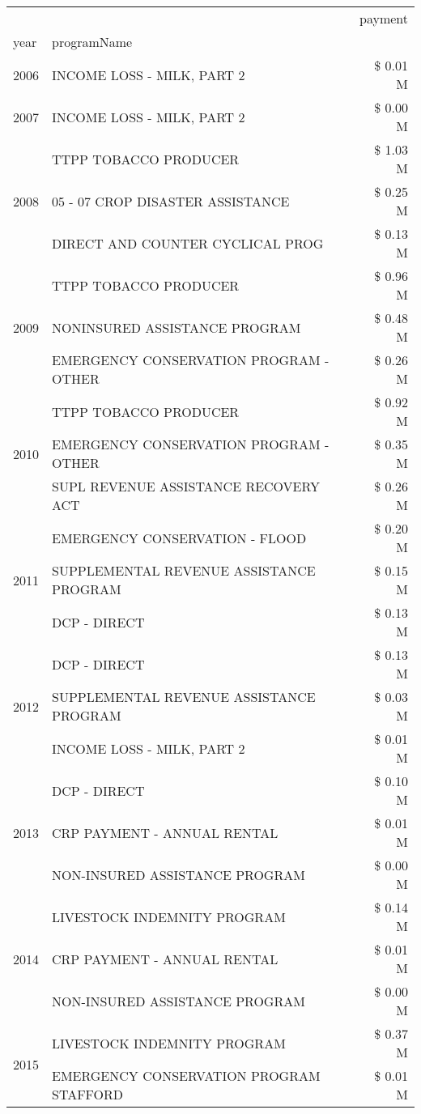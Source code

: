 \begin{tabular}{llr}
\toprule
 &  & payment \\
year & programName &  \\
\midrule
2006 & INCOME LOSS - MILK, PART 2 & \$ 0.01 M \\
\cline{1-3}
2007 & INCOME LOSS - MILK, PART 2 & \$ 0.00 M \\
\cline{1-3}
\multirow[t]{3}{*}{2008} & TTPP TOBACCO PRODUCER & \$ 1.03 M \\
 & 05 - 07 CROP DISASTER ASSISTANCE & \$ 0.25 M \\
 & DIRECT AND COUNTER CYCLICAL PROG & \$ 0.13 M \\
\cline{1-3}
\multirow[t]{3}{*}{2009} & TTPP TOBACCO PRODUCER & \$ 0.96 M \\
 & NONINSURED ASSISTANCE PROGRAM & \$ 0.48 M \\
 & EMERGENCY CONSERVATION PROGRAM - OTHER & \$ 0.26 M \\
\cline{1-3}
\multirow[t]{3}{*}{2010} & TTPP TOBACCO PRODUCER & \$ 0.92 M \\
 & EMERGENCY CONSERVATION PROGRAM - OTHER & \$ 0.35 M \\
 & SUPL REVENUE ASSISTANCE RECOVERY ACT & \$ 0.26 M \\
\cline{1-3}
\multirow[t]{3}{*}{2011} & EMERGENCY CONSERVATION - FLOOD & \$ 0.20 M \\
 & SUPPLEMENTAL REVENUE ASSISTANCE PROGRAM & \$ 0.15 M \\
 & DCP - DIRECT & \$ 0.13 M \\
\cline{1-3}
\multirow[t]{3}{*}{2012} & DCP - DIRECT & \$ 0.13 M \\
 & SUPPLEMENTAL REVENUE ASSISTANCE PROGRAM & \$ 0.03 M \\
 & INCOME LOSS - MILK, PART 2 & \$ 0.01 M \\
\cline{1-3}
\multirow[t]{3}{*}{2013} & DCP - DIRECT & \$ 0.10 M \\
 & CRP PAYMENT - ANNUAL RENTAL & \$ 0.01 M \\
 & NON-INSURED ASSISTANCE PROGRAM & \$ 0.00 M \\
\cline{1-3}
\multirow[t]{3}{*}{2014} & LIVESTOCK INDEMNITY PROGRAM & \$ 0.14 M \\
 & CRP PAYMENT - ANNUAL RENTAL & \$ 0.01 M \\
 & NON-INSURED ASSISTANCE PROGRAM & \$ 0.00 M \\
\cline{1-3}
\multirow[t]{3}{*}{2015} & LIVESTOCK INDEMNITY PROGRAM & \$ 0.37 M \\
 & EMERGENCY CONSERVATION PROGRAM STAFFORD & \$ 0.01 M \\

\end{tabular}
